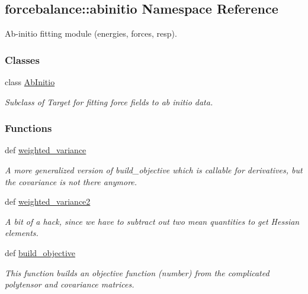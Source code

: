 \hypertarget{namespaceforcebalance_1_1abinitio}{\subsection{forcebalance\-:\-:abinitio \-Namespace \-Reference}
\label{namespaceforcebalance_1_1abinitio}
}


\-Ab-\/initio fitting module (energies, forces, resp).  


\subsubsection*{\-Classes}
\begin{DoxyCompactItemize}
\item 
class \hyperlink{classforcebalance_1_1abinitio_1_1AbInitio}{\-Ab\-Initio}
\begin{DoxyCompactList}\small\item\em \-Subclass of \-Target for fitting force fields to ab initio data. \end{DoxyCompactList}\end{DoxyCompactItemize}
\subsubsection*{\-Functions}
\begin{DoxyCompactItemize}
\item 
def \hyperlink{namespaceforcebalance_1_1abinitio_aba970cb59bab95eec79027ea05655110}{weighted\-\_\-variance}
\begin{DoxyCompactList}\small\item\em \-A more generalized version of build\-\_\-objective which is callable for derivatives, but the covariance is not there anymore. \end{DoxyCompactList}\item 
def \hyperlink{namespaceforcebalance_1_1abinitio_ab9554761125a4ec7c3c13d6ae4ea537d}{weighted\-\_\-variance2}
\begin{DoxyCompactList}\small\item\em \-A bit of a hack, since we have to subtract out two mean quantities to get \-Hessian elements. \end{DoxyCompactList}\item 
def \hyperlink{namespaceforcebalance_1_1abinitio_aadd1d6c5a34c82d495d6be7380b73601}{build\-\_\-objective}
\begin{DoxyCompactList}\small\item\em \-This function builds an objective function (number) from the complicated polytensor and covariance matrices. \end{DoxyCompactList}\end{DoxyCompactItemize}
